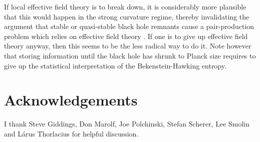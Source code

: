 \documentclass[11pt,twoside]{article}
\begin{document}
If local effective field theory is to break down, it
is considerably more plausible that this would happen in the
strong curvature regime, thereby invalidating the argument that 
stable or quasi-stable black hole remnants cause a pair-production
problem which relies on effective field theory \cite{Hossenfelder:2009xq}. 
If one is to give up effective field theory anyway, then this seems to be 
the less radical way to do it. Note however that storing information
until the black hole has shrunk to Planck size requires to give
up the statistical interpretation of the Bekenstein-Hawking entropy.

\section*{Acknowledgements}

I thank Steve Giddings, Don Marolf, Joe Polchinski, Stefan Scherer, Lee Smolin and L\'arus Thorlacius
for helpful discussion.
\end{document}
